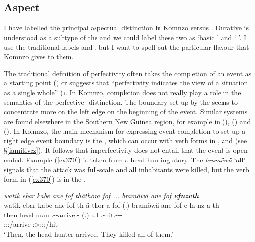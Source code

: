 \subsection{Aspect}\label{TAMsemaspect}

I have labelled the principal aspectual distinction in Komnzo  versus . Durative  is understood as a subtype of the  and we could label these two as `basic ' and ` '. I use the traditional labels  and , but I want to spell out the particular flavour that Komnzo gives to them.%

The traditional definition of perfectivity often takes the completion of an event as a starting point (\citealt[296]{Frawley:1992wi}) or suggests that ``perfectivity indicates the view of a situation as a single whole'' (\citealt[16]{Comrie:1976vd}). In Komnzo, completion does not really play a role in the semantics of the perfective- distinction. The boundary set up by the  seems to concentrate more on the left edge \textendash{} on the beginning of the event. Similar systems are found elsewhere in the Southern New Guinea region, for example in  (\citealt[41]{Drabbe:1955tm}),  (\citealt{Siegel:2015bp}) and  (\citealt{Evans:2015wy}). In Komnzo, the main mechanism for expressing event completion \textendash{} to set up a right edge event boundary \textendash{} is the  , which can occur with verb forms in ,  and   (see \S{}\ref{iamitivez}). It follows that imperfectivity does not entail that the event is open-ended. Example (\ref{ex370}) is taken from a head hunting story. The  \emph{bramöwä} `all' signals that the attack was full-scale and all inhabitants were killed, but the verb form in (\ref{ex370}) is in the .

\begin{exe}
	\ex \emph{watik ebar kabe ane fof thäthora fof ... bramöwä ane fof \textbf{efnzath}}\\
	\glll watik ebar kabe ane fof th-ä-thor-a fof (.) bramöwä ane fof e-fn-nz-a-th\\
	then head man \Dem{} \Emph{} \Stnsg.\Gam-\Ndu-arrive.\Rs-\Pst{} \Emph{} (.) all \Dem{} \Emph{} \Stnsg.\Alph-hit.\Ext-\Ndu-\Pst-\Stnsg{}\\
	{} {} {} {} {} \footnotesize{\Stpl:\Sbj:\Pst:\Pfv/arrive} {} {} {} {} {} \footnotesize{\Stpl:\Sbj>\Stpl:\Obj:\Pst:\Ipfv/hit}\\
	\trans `Then, the head hunter arrived. They killed all of them.'\\ 
	\label{ex370}
\end{exe}

